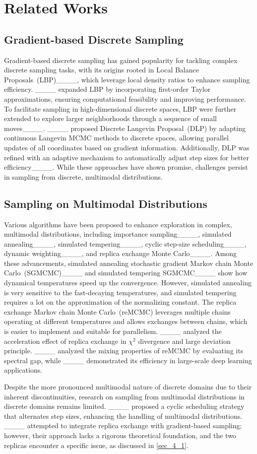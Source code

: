 \section{Related Works}
\label{sec:2}
\subsection{Gradient-based Discrete Sampling}\label{sec:2.1}
Gradient-based discrete sampling has gained popularity for tackling complex discrete sampling tasks, with its origins rooted in Local Balance Proposals~(LBP)____, which leverage local density ratios to enhance sampling efficiency. ____ expanded LBP by incorporating first-order Taylor approximations, ensuring computational feasibility and improving performance. To facilitate sampling in high-dimensional discrete spaces, LBP were further extended to explore larger neighborhoods through a sequence of small moves____. ____ proposed Discrete Langevin Proposal~(DLP) by adapting continuous Langevin MCMC methods to discrete spaces, allowing parallel updates of all coordinates based on gradient information. Additionally, DLP was refined with an adaptive mechanism to automatically adjust step sizes for better efficiency____. While these approaches have shown promise, challenges persist in sampling from discrete, multimodal distributions.

\subsection{Sampling on Multimodal Distributions}\label{sec:2.2}
Various algorithms have been proposed to enhance exploration in complex, multimodal distributions, including importance sampling____, simulated annealing____, simulated tempering____, cyclic step-size scheduling____, dynamic weighting____, and replica exchange Monte Carlo____. Among these advancements, simulated annealing stochastic gradient Markov chain Monte Carlo~(SGMCMC)____ and simulated tempering SGMCMC____ show how dynamical temperatures speed up the convergence. However, simulated annealing is very sensitive to the fast-decaying temperatures, and simulated tempering requires a lot on the approximation of the normalizing constant. The replica exchange Markov chain Monte Carlo~(reMCMC) leverages multiple chains operating at different temperatures and allows exchanges between chains, which is easier to implement and suitable for parallelism. ____ analyzed the acceleration effect of replica exchange in $\chi^2$ divergence and large deviation principle. ____ analyzed the mixing properties of reMCMC by evaluating its spectral gap, while ____ demonstrated its efficiency in large-scale deep learning applications. 

Despite the more pronounced multimodal nature of discrete domains due to their inherent discontinuities, research on sampling from multimodal distributions in discrete domains remains limited. ____ proposed a cyclic scheduling strategy that alternates step sizes, enhancing the handling of multimodal distributions. ____ attempted to integrate replica exchange with gradient-based sampling; however, their approach lacks a rigorous theoretical foundation, and the two replicas encounter a specific issue, as discussed in \cref{sec_4_1}.